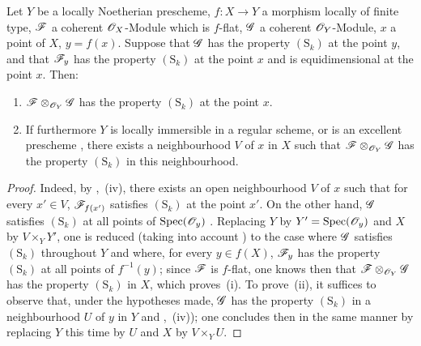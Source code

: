 \begin{corollary}[12.1.5]
\label{IV.12.1.5}
Let $Y$ be a locally Noetherian prescheme, $f:X\to Y$ a morphism locally of finite type, $\mathscr{F}$ a coherent $\mathscr{O}_X$-Module which is $f$-flat, $\mathscr{G}$ a coherent $\mathscr{O}_Y$-Module, $x$ a point of $X$, $y=f(x)$.
Suppose that $\mathscr{G}$ has the property $(\mathrm{S}_k)$ at the point $y$, and that $\mathscr{F}_y$ has the property $(\mathrm{S}_k)$ at the point $x$ and is equidimensional at the point $x$.
Then:
\begin{enumerate}[label=(\roman*)]
  \item $\mathscr{F}\otimes_{\mathscr{O}_Y}\mathscr{G}$ has the property $(\mathrm{S}_k)$ at the point $x$.
  \item If furthermore $Y$ is locally immersible in a regular scheme, or is an excellent prescheme , there exists a neighbourhood $V$ of $x$ in $X$ such that $\mathscr{F}\otimes_{\mathscr{O}_Y}\mathscr{G}$ has the property $(\mathrm{S}_k)$ in this neighbourhood.
\end{enumerate}
\end{corollary}

\begin{proof}
Indeed, by ,~(iv), there exists an open neighbourhood $V$ of $x$ such that for every $x'\in V$, $\mathscr{F}_{f(x')}$ satisfies $(\mathrm{S}_k)$ at the point $x'$.
On the other hand, $\mathscr{G}$ satisfies $(\mathrm{S}_k)$ at all points of $\operatorname{Spec}(\mathscr{O}_y)$ .
Replacing $Y$ by $Y'=\operatorname{Spec}(\mathscr{O}_y)$ and $X$ by $V\times_Y Y'$, one is reduced (taking into account ) to the case where $\mathscr{G}$ satisfies $(\mathrm{S}_k)$ throughout $Y$ and where, for every $y\in f(X)$, $\mathscr{F}_y$ has the property $(\mathrm{S}_k)$ at all points of $f^{-1}(y)$; since $\mathscr{F}$ is $f$-flat, one knows then  that $\mathscr{F}\otimes_{\mathscr{O}_Y}\mathscr{G}$ has the property $(\mathrm{S}_k)$ in $X$, which proves~(i).
To prove~(ii), it suffices to observe that, under the hypotheses made, $\mathscr{G}$ has the
property $(\mathrm{S}_k)$ in a neighbourhood $U$ of $y$ in $Y$  and ,~(iv)); one concludes then in the same manner by replacing $Y$ this time by $U$ and $X$ by $V\times_Y U$.
\end{proof}

